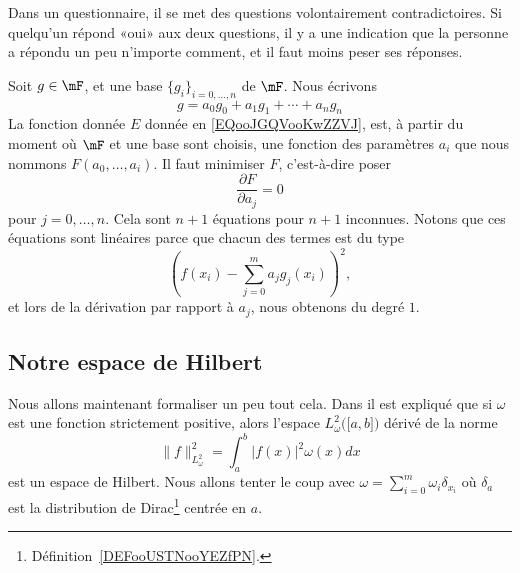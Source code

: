 \begin{example}
	Dans un questionnaire, il se met des questions volontairement contradictoires. Si quelqu'un répond «oui» aux deux questions, il y a une indication que la personne a répondu un peu n'importe comment, et il faut moins peser ses réponses.
\end{example}

Soit \( g\in \mF\), et une base \( \{ g_i \}_{i=0,\ldots, n}\) de \( \mF\). Nous écrivons
\begin{equation}
	g=a_0g_0+a_1g_1+\cdots +a_ng_n
\end{equation}
La fonction donnée \( E\) donnée en \eqref{EQooJGQVooKwZZVJ}, est, à partir du moment où \( \mF\) et une base sont choisis, une fonction des paramètres \( a_i\) que nous nommons \( F(a_0,\ldots, a_i)\). Il faut minimiser \( F\), c'est-à-dire poser
\begin{equation}
	\frac{ \partial F }{ \partial a_j }=0
\end{equation}
pour \( j=0,\ldots, n\). Cela sont \( n+1\) équations pour \( n+1\) inconnues. Notons que ces équations sont linéaires parce que chacun des termes est du type
\begin{equation}
	\left( f(x_i)-\sum_{j=0}^ma_jg_j(x_i) \right)^2,
\end{equation}
et lors de la dérivation par rapport à \( a_j\), nous obtenons du degré \( 1\).

\subsection{Notre espace de Hilbert}

Nous allons maintenant formaliser un peu tout cela. Dans \cite{ooPTFGooScbUWC} il est expliqué que si \( \omega\) est une fonction strictement positive, alors l'espace \( L^2_{\omega}\big( \mathopen[ a , b \mathclose] \big)\) dérivé de la norme
\begin{equation}
	\| f \|_{L^2_{\omega}}^2=\int_a^b| f(x) |^2\omega(x)dx
\end{equation}
est un espace de Hilbert. Nous allons tenter le coup avec \( \omega=\sum_{i=0}^m\omega_i\delta_{x_i}\) où \( \delta_a\) est la distribution de Dirac\footnote{Définition~\ref{DEFooUSTNooYEZfPN}.} centrée en \( a\).

